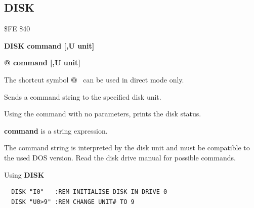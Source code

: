 \subsection{DISK}
\begin{description}[leftmargin=2cm,style=nextline]
\item [Token:] \$FE \$40
\item [Format:] {\bf DISK command [,U unit] }
\item [Format:] {\bf @ command [,U unit] }
\item [Usage:]

   The shortcut symbol {\bf @}  can be used in direct mode only.

   Sends a command string to the specified disk unit.

   Using the command with no parameters, prints the disk status.

   \unitdefinition

   {\bf command} is a string expression.

\item [Remarks:]
   The command string is interpreted by the disk unit
   and must be compatible to the used DOS version.
   Read the disk drive manual for possible commands.

\item [Example:] Using {\bf DISK}
\begin{tcolorbox}[colback=black,coltext=white]
\verbatimfont{\codefont}
\begin{verbatim}
  DISK "I0"   :REM INITIALISE DISK IN DRIVE 0
  DISK "U0>9" :REM CHANGE UNIT# TO 9
\end{verbatim}
\end{tcolorbox}
\end{description}


\newpage
